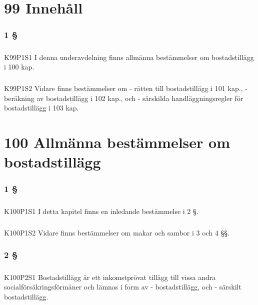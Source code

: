 \documentclass[a4paper,notitlepage,openany,10pt]{book}
\begin{document}
\chapter*{99 Innehåll}
\subsection*{1 §}
\paragraph*{}
{\tiny K99P1S1}
I denna underavdelning finns allmänna bestämmelser om bostadstillägg i 100 kap.
\paragraph*{}
{\tiny K99P1S2}
Vidare finns bestämmelser om
\newline - rätten till bostadstillägg i 101 kap.,
\newline - beräkning av bostadstillägg i 102 kap., och
\newline - särskilda handläggningsregler för bostadstillägg i 103 kap.
\chapter*{100 Allmänna bestämmelser om bostadstillägg}
\subsection*{1 §}
\paragraph*{}
{\tiny K100P1S1}
I detta kapitel finns en inledande bestämmelse i 2 §.
\paragraph*{}
{\tiny K100P1S2}
Vidare finns bestämmelser om makar och sambor i 3 och 4 §§.
\subsection*{2 §}
\paragraph*{}
{\tiny K100P2S1}
Bostadstillägg är ett inkomstprövat tillägg till vissa andra socialförsäkringsförmåner och lämnas i form av
\newline - bostadstillägg, och
\newline - särskilt bostadstillägg.
\end{document}
